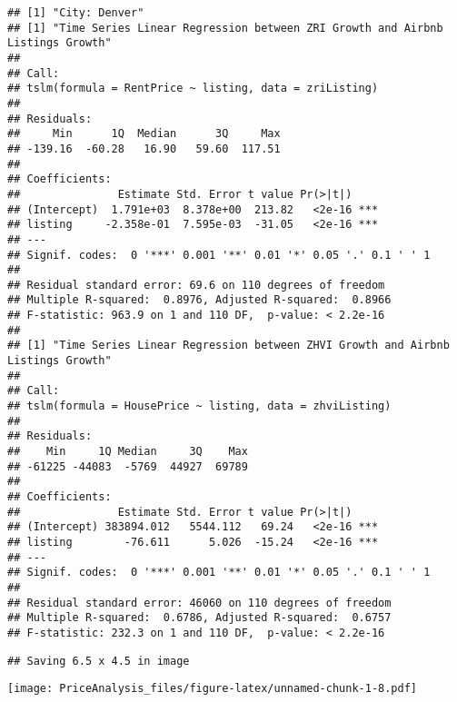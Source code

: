 \documentclass[
]{article}
\begin{document}
\begin{verbatim}
## [1] "City: Denver"
## [1] "Time Series Linear Regression between ZRI Growth and Airbnb Listings Growth"
## 
## Call:
## tslm(formula = RentPrice ~ listing, data = zriListing)
## 
## Residuals:
##     Min      1Q  Median      3Q     Max 
## -139.16  -60.28   16.90   59.60  117.51 
## 
## Coefficients:
##               Estimate Std. Error t value Pr(>|t|)    
## (Intercept)  1.791e+03  8.378e+00  213.82   <2e-16 ***
## listing     -2.358e-01  7.595e-03  -31.05   <2e-16 ***
## ---
## Signif. codes:  0 '***' 0.001 '**' 0.01 '*' 0.05 '.' 0.1 ' ' 1
## 
## Residual standard error: 69.6 on 110 degrees of freedom
## Multiple R-squared:  0.8976, Adjusted R-squared:  0.8966 
## F-statistic: 963.9 on 1 and 110 DF,  p-value: < 2.2e-16
## 
## [1] "Time Series Linear Regression between ZHVI Growth and Airbnb Listings Growth"
## 
## Call:
## tslm(formula = HousePrice ~ listing, data = zhviListing)
## 
## Residuals:
##    Min     1Q Median     3Q    Max 
## -61225 -44083  -5769  44927  69789 
## 
## Coefficients:
##               Estimate Std. Error t value Pr(>|t|)    
## (Intercept) 383894.012   5544.112   69.24   <2e-16 ***
## listing        -76.611      5.026  -15.24   <2e-16 ***
## ---
## Signif. codes:  0 '***' 0.001 '**' 0.01 '*' 0.05 '.' 0.1 ' ' 1
## 
## Residual standard error: 46060 on 110 degrees of freedom
## Multiple R-squared:  0.6786, Adjusted R-squared:  0.6757 
## F-statistic: 232.3 on 1 and 110 DF,  p-value: < 2.2e-16
\end{verbatim}

\begin{verbatim}
## Saving 6.5 x 4.5 in image
\end{verbatim}

\texttt{[image: PriceAnalysis\_files/figure-latex/unnamed-chunk-1-8.pdf]}
\end{document}
